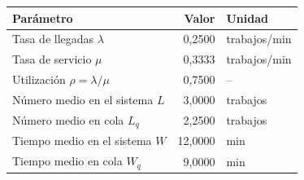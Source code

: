\begin{tabular}{lrl}
\toprule
Parámetro & Valor & Unidad \\
\midrule
Tasa de llegadas $\lambda$ & 0,2500 & trabajos/min \\
Tasa de servicio $\mu$ & 0,3333 & trabajos/min \\
Utilización $\rho=\lambda/\mu$ & 0,7500 & -- \\
Número medio en el sistema $L$ & 3,0000 & trabajos \\
Número medio en cola $L_q$ & 2,2500 & trabajos \\
Tiempo medio en el sistema $W$ & 12,0000 & min \\
Tiempo medio en cola $W_q$ & 9,0000 & min \\
\bottomrule
\end{tabular}
